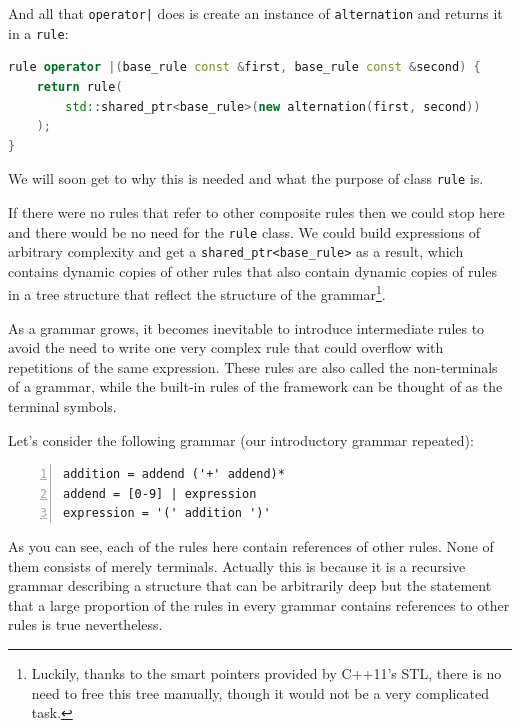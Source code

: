 \documentclass[12pt]{article}
\begin{document}
And all that \texttt{operator|} does is create an instance of \texttt{alternation} and returns it in a
\texttt{rule}:

\begin{center}
	\begin{minipage}[h]{0.8\textwidth}
		\begin{lstlisting}[language=C++, breaklines=true]
rule operator |(base_rule const &first, base_rule const &second) {
	return rule(
		std::shared_ptr<base_rule>(new alternation(first, second))
	);
}
		\end{lstlisting}
	\end{minipage}
\end{center}

We will soon get to why this is needed and what the purpose of class \texttt{rule} is.

If there were no rules that refer to other composite rules then we could stop here and there would be no need
for the \texttt{rule} class. We could build expressions of arbitrary complexity and get a
\texttt{shared\_ptr<base\_rule>} as a result, which contains dynamic copies of other rules that also
contain dynamic copies of rules in a tree structure that reflect the structure of the
grammar\footnote{Luckily, thanks to the smart pointers provided by C++11's STL, there is no need to free
this tree manually, though it would not be a very complicated task.}.

As a grammar grows, it becomes inevitable to introduce intermediate rules to avoid the need to write one very
complex rule that could overflow with repetitions of the same expression. These rules are also called the
non-terminals of a grammar, while the built-in rules of the framework can be thought of as the terminal
symbols.

Let's consider the following grammar (our introductory grammar repeated):

\begin{center}
	\begin{minipage}[h]{0.5\textwidth}\label{lst:numberedexpressiongrammar}
		\begin{lstlisting}[breaklines=true, numbers=left]
addition = addend ('+' addend)*
addend = [0-9] | expression
expression = '(' addition ')'
		\end{lstlisting}
	\end{minipage}
\end{center}

As you can see, each of the rules here contain references of other rules. None of them consists of merely
terminals. Actually this is because it is a recursive grammar describing a structure that can be arbitrarily
deep but the statement that a large proportion of the rules in every grammar contains references to other
rules is true nevertheless.
\end{document}
